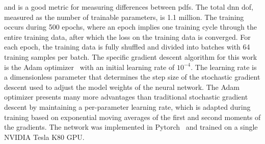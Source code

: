 \documentclass[review]{elsarticle}
\begin{document}
and is a good metric for measuring differences between
\glspl{pdf}. The total \gls{dnn} \gls{dof}, measured as the number of
trainable parameters, is 1.1 million. The training occurs during 500
epochs, where an epoch implies one training cycle through the entire
training data, after which the loss on the training data is
converged. For each epoch, the training data is fully shuffled and
divided into batches with 64 training samples per batch. The specific
gradient descent algorithm for this work is the Adam
optimizer~\cite{Kingma2014} with an initial learning rate of
$10^{-4}$. The learning rate is a dimensionless parameter that
determines the step size of the stochastic gradient descent used to adjust
the model weights of the neural network. The Adam optimizer presents
many more advantages than traditional stochastic gradient descent by
maintaining a per-parameter learning rate, which is adapted during
training based on exponential moving averages of the first and second
moments of the gradients. The network was implemented in
Pytorch~\cite{Paszke2017} and trained on a single NVIDIA Tesla K80
GPU.
\end{document}
